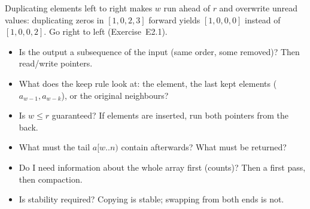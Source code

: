 \begin{warningbox}
Duplicating elements left to right makes $w$ run ahead of $r$ and overwrite unread values: duplicating zeros in $[1, 0, 2, 3]$ forward yields $[1, 0, 0, 0]$ instead of $[1, 0, 0, 2]$. Go right to left (Exercise~E2.1).
\end{warningbox}

\begin{checklistbox}
\begin{itemize}[leftmargin=*]
    \item[$\square$] Is the output a subsequence of the input (same order, some removed)? Then read/write pointers.
    \item[$\square$] What does the keep rule look at: the element, the last kept elements ($a_{w-1}, a_{w-k}$), or the original neighbours?
    \item[$\square$] Is $w \le r$ guaranteed? If elements are inserted, run both pointers from the back.
    \item[$\square$] What must the tail $a[w..n)$ contain afterwards? What must be returned?
    \item[$\square$] Do I need information about the whole array first (counts)? Then a first pass, then compaction.
    \item[$\square$] Is stability required? Copying is stable; swapping from both ends is not.
\end{itemize}
\end{checklistbox}
